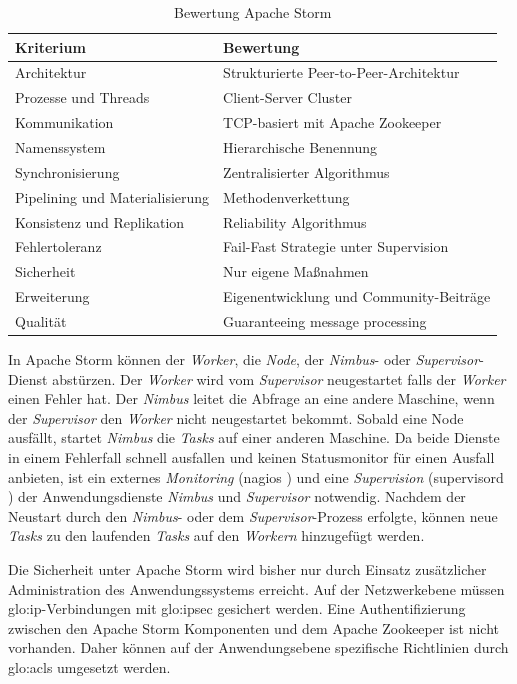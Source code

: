 \begin{table}[ht!]
	\centering
		\begin{tabular}{@{}ll@{}} \toprule
			\textbf{Kriterium} & \textbf{Bewertung} \\ \midrule
			Architektur & Strukturierte Peer-to-Peer-Architektur \\
			Prozesse und Threads & Client-Server Cluster \\
			Kommunikation & TCP-basiert mit Apache Zookeeper \\
			Namenssystem & Hierarchische Benennung \\
			Synchronisierung & Zentralisierter Algorithmus \\
			Pipelining und Materialisierung & Methodenverkettung \\
			Konsistenz und Replikation & Reliability Algorithmus \\
			Fehlertoleranz & Fail-Fast Strategie unter Supervision \\
			Sicherheit & Nur eigene Maßnahmen \\
			Erweiterung & Eigenentwicklung und Community-Beiträge \\
			Qualität & Guaranteeing message processing \\
			\bottomrule			
		\end{tabular}
	\caption{Bewertung Apache Storm}
	\label{tab:bewstorm}
\end{table}

In Apache Storm können der \textit{Worker}, die \textit{Node}, der \textit{Nimbus}- oder \textit{Supervisor}-Dienst abstürzen. Der \textit{Worker} wird vom \textit{Supervisor} neugestartet falls der \textit{Worker} einen Fehler hat. Der \textit{Nimbus} leitet die Abfrage an eine andere Maschine, wenn der \textit{Supervisor} den \textit{Worker} nicht neugestartet bekommt. Sobald eine Node ausfällt, startet \textit{Nimbus} die \textit{Tasks} auf einer anderen Maschine. Da beide Dienste in einem Fehlerfall schnell ausfallen und keinen Statusmonitor für einen Ausfall anbieten, ist ein externes \textit{Monitoring} (nagios ) und eine \textit{Supervision} (supervisord ) der Anwendungsdienste \textit{Nimbus} und \textit{Supervisor} notwendig. Nachdem der Neustart durch den \textit{Nimbus}- oder dem \textit{Supervisor}-Prozess erfolgte, können neue \textit{Tasks} zu den laufenden \textit{Tasks} auf den \textit{Workern} hinzugefügt werden. 

Die Sicherheit unter Apache Storm wird bisher nur durch Einsatz zusätzlicher Administration des Anwendungssystems erreicht. Auf der Netzwerkebene müssen \gls{glo:ip}-Verbindungen mit \gls{glo:ipsec} gesichert werden. Eine Authentifizierung zwischen den Apache Storm Komponenten und dem Apache Zookeeper ist nicht vorhanden. Daher können auf der Anwendungsebene spezifische Richtlinien durch \glspl{glo:acl} umgesetzt werden. 

